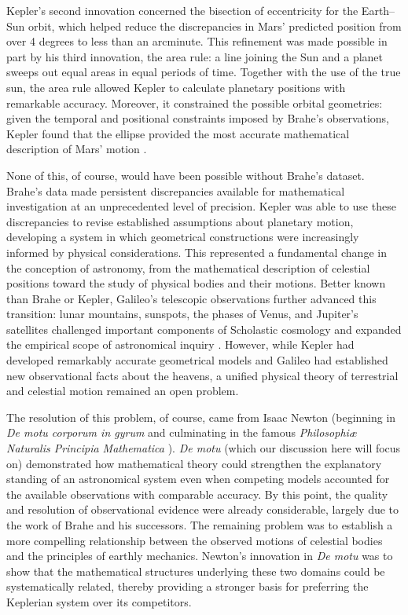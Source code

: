 \documentclass{article}
\begin{document}
Kepler's second innovation concerned the bisection of eccentricity for the Earth--Sun orbit, which helped reduce the 
discrepancies in Mars' predicted position from over 4 degrees to less than an arcminute. This refinement was made 
possible in part by his third innovation, the area rule: a line joining the Sun and a planet sweeps out equal areas 
in equal periods of time. Together with the use of the true sun, the area rule allowed Kepler to calculate planetary 
positions with remarkable accuracy. Moreover, it constrained the possible orbital geometries: given the temporal and 
positional constraints imposed by Brahe's observations, Kepler found that the ellipse provided the most accurate 
mathematical description of Mars' motion \textit{\parencite{stephenson1987}}. 

None of this, of course, would have been possible without Brahe's dataset. Brahe's data made persistent discrepancies 
available for mathematical investigation at an unprecedented level of precision. Kepler was able to use these discrepancies 
to revise established assumptions about planetary motion, developing a system in which geometrical constructions were 
increasingly informed by physical considerations. This represented a fundamental change in the conception of astronomy, 
from the mathematical description of celestial positions toward the study of physical bodies and their motions. Better known than Brahe or Kepler, Galileo's telescopic observations further advanced this transition: lunar mountains, 
sunspots, the phases of Venus, and Jupiter's satellites challenged important components of Scholastic cosmology and 
expanded the empirical scope of astronomical inquiry \textit{\parencite{galileo1989,galileo2010}}. However, while Kepler had developed remarkably accurate geometrical 
models and Galileo had established new observational facts about the heavens, a unified physical theory of terrestrial and 
celestial motion remained an open problem.

The resolution of this problem, of course, came from Isaac Newton (beginning in \textit{De motu corporum in gyrum} \textit{\parencite{whiteside1974}} and culminating in the 
famous \textit{Philosophiæ Naturalis Principia Mathematica} \textit{\parencite{newton1687,newton1999}}). \textit{De motu} (which our discussion here will focus on) demonstrated how mathematical theory 
could strengthen the explanatory standing of an astronomical system even when competing models accounted for the 
available observations with comparable accuracy. By this point, the quality and resolution of observational evidence
were already considerable, largely due to the work of Brahe and his successors. The remaining problem was to establish a 
more compelling relationship between the observed motions of celestial bodies and the principles of earthly mechanics. 
Newton's innovation in \textit{De motu} was to show that the mathematical structures underlying these two domains could be systematically 
related, thereby providing a stronger basis for preferring the Keplerian system over its competitors.
\end{document}
